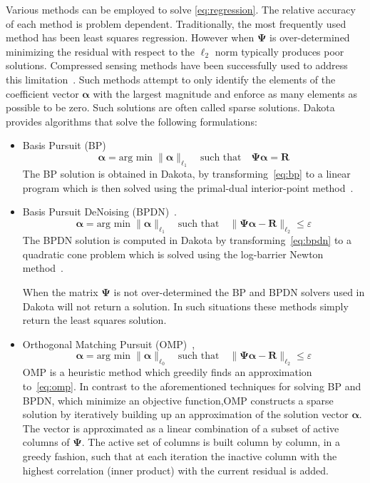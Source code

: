 Various methods can be employed to solve \eqref{eq:regression}.
The relative accuracy of each method is problem dependent. Traditionally,
 the most frequently used method has been least squares regression. However 
when $\boldsymbol{\Psi}$ is over-determined minimizing the residual with respect to
the $\ell_2$ norm typically produces poor solutions. Compressed sensing methods have been
successfully used to address this limitation~\cite{Blatman2011,Doostan2011}. 
Such methods attempt to only identify the 
elements of the coefficient vector $\boldsymbol{\alpha}$ with the largest magnitude 
and enforce as many elements as possible to be zero. Such solutions are often called 
sparse solutions. Dakota provides algorithms that solve the following formulations:
\begin{itemize}
 \item Basis Pursuit (BP)~\cite{Chen2001}
\begin{equation}
\label{eq:bp}
\boldsymbol{\alpha} = \text{arg min} \; \|\boldsymbol{\alpha}\|_{\ell_1}\quad \text{such that}\quad \boldsymbol{\Psi}\boldsymbol{\alpha} = \boldsymbol{R}
\end{equation}
The BP solution is obtained in Dakota, by transforming~\eqref{eq:bp} to a 
linear program which is then solved using the primal-dual
interior-point method~\cite{Boyd2004,Chen2001}.
\item Basis Pursuit DeNoising (BPDN)~\cite{Chen2001}. 
\begin{equation}
\label{eq:bpdn}
\boldsymbol{\alpha} = \text{arg min}\; \|\boldsymbol{\alpha}\|_{\ell_1}\quad \text{such that}\quad \|\boldsymbol{\Psi}\boldsymbol{\alpha} - \boldsymbol{R}\|_{\ell_2} \le \varepsilon
\end{equation}
The BPDN solution is computed in Dakota by transforming~\eqref{eq:bpdn} 
to a quadratic cone problem which is solved using the log-barrier Newton 
method~\cite{Boyd2004,Chen2001}. 


When the matrix $\boldsymbol{\Psi}$ is not over-determined the BP and BPDN solvers used in Dakota
will not return a solution. In such situations these methods simply return the least squares solution.
\item Orthogonal Matching Pursuit (OMP)~\cite{Davis1997},
\begin{equation}
\label{eq:omp}
\boldsymbol{\alpha} = \text{arg min}\; \|\boldsymbol{\alpha}\|_{\ell_0}\quad \text{such that}\quad \|\boldsymbol{\Psi}\boldsymbol{\alpha} - \boldsymbol{R}\|_{\ell_2} \le \varepsilon
\end{equation}
OMP is a heuristic method which greedily finds an approximation to~\eqref{eq:omp}. In contrast to the aforementioned techniques for solving BP and BPDN, 
which minimize an objective function,OMP constructs a sparse solution by iteratively 
building up an approximation of the solution vector $\boldsymbol{\alpha}$. 
The vector is approximated as a linear combination of a subset of active columns of 
$\boldsymbol{\Psi}$. The active set of columns is built column by column, in
a greedy fashion, such that at each iteration the inactive column with the highest correlation
(inner product) with the current residual is added.


\end{itemize}
